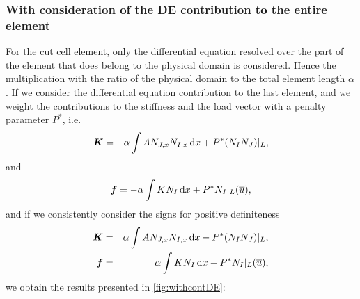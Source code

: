 \documentclass[a4paper,12pt]{article}
\newcommand{\mb}[1]{{\mbox{\boldmath$#1$\unboldmath}}}
\newcommand{\intd}{\,{\rm d}}
\begin{document}
\subsubsection{With consideration of the DE contribution to the entire element}
For the cut cell element, only the differential equation resolved over the part of the element that does belong to the physical domain is considered. Hence the multiplication with the ratio of the physical domain to the total element length $\alpha$.
If we consider the differential equation contribution to the last element, and we weight the contributions to the stiffness and the load vector with a penalty parameter $P^*$, i.e.
\begin{equation*}
\mb{K} = - \alpha \int AN_{J,x}N_{I,x}\intd x + P^*(N_I N_J)\vert_{L},
\end{equation*}
and
\begin{equation*}
\mb{f} = - \alpha \int K N_I \intd x +  P^*N_I\vert_{L}(\overline{u}),
\end{equation*}
and if we consistently consider the signs for positive definiteness
\begin{eqnarray*}
\mb{K} &=&  \alpha \int AN_{J,x}N_{I,x}\intd x - P^*(N_I N_J)\vert_{L},\\
\mb{f} &=&  \alpha \int K N_I \intd x -  P^*N_I\vert_{L}(\overline{u}),
\end{eqnarray*}
we obtain the results presented in \ref{fig:withcontDE}:
\end{document}
